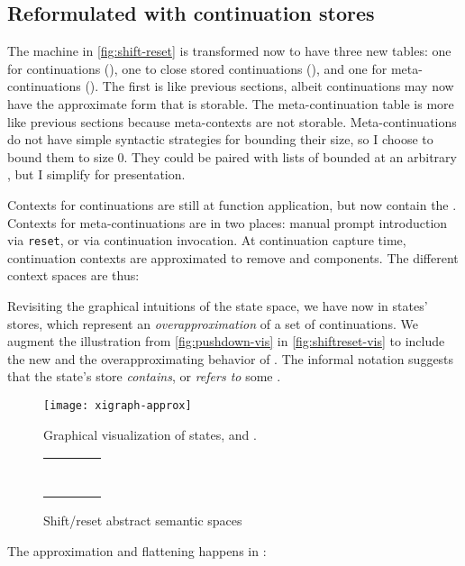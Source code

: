 \subsection{Reformulated with continuation stores}
The machine in \autoref{fig:shift-reset} is transformed now to have three new tables: one for continuations (), one to close stored continuations (), and one for meta-continuations ().
The first is like previous sections, albeit continuations may now have the approximate form that is storable.
The meta-continuation table is more like previous sections because meta-contexts are not storable.
Meta-continuations do not have simple syntactic strategies for bounding their size, so I choose to bound them to size 0.
They could be paired with lists of  bounded at an arbitrary , but I simplify for presentation.

Contexts for continuations are still at function application, but now contain the .
Contexts for meta-continuations are in two places: manual prompt introduction via {\tt reset}, or via continuation invocation.
At continuation capture time, continuation contexts are approximated to remove  and  components.
The different context spaces are thus:



Revisiting the graphical intuitions of the state space, we have now  in states' stores, which represent an \emph{overapproximation} of a set of continuations.
We augment the illustration from \autoref{fig:pushdown-vis} in \autoref{fig:shiftreset-vis} to include the new  and the overapproximating behavior of .
The informal notation  suggests that the state's store \emph{contains}, or \emph{refers to} some .

\begin{figure}
  \centering
  \texttt{[image: xigraph-approx]}
  \caption{Graphical visualization of states,  and .}
  \label{fig:shiftreset-vis}
\end{figure}

\begin{figure}
  \centering
  \begin{tabular}{rlrl}
     &\multicolumn{3}{l}{\hspace{-3mm}} \\
     & \multicolumn{3}{l}{\hspace{-3mm}} \\
     &\multicolumn{3}{l}{\hspace{-3mm}} \\
     &\multicolumn{3}{l}{\hspace{-3mm}} \\
     &\multicolumn{3}{l}{\hspace{-3mm}} \\
     &\hspace{-3mm} &  &\hspace{-3mm} \\
     &\hspace{-3mm} &  &\hspace{-3mm}
  \end{tabular}
  \caption{Shift/reset abstract semantic spaces}
  \label{fig:shiftreset-spaces}
\end{figure}
The approximation and flattening happens in :


